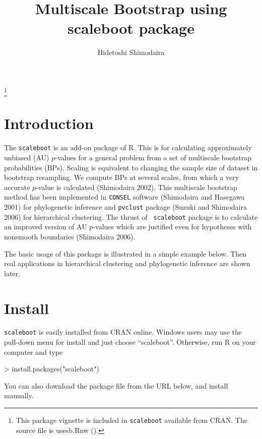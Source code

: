 \documentclass[a4paper]{amsart}
\begin{document}
\title{Multiscale Bootstrap using scaleboot package}
\author{Hidetoshi Shimodaira}
\thanks{This package vignette is included in {\tt scaleboot}
 available from CRAN. The source file is usesb.Rnw (\documentid).}
\address{Department of Mathematical and Computing Sciences\\
Tokyo Institute of Technology\\
2-12-1 Ookayama, Meguro-ku, Tokyo 152-8552, Japan}


\maketitle

\section{Introduction}

The {\tt scaleboot} is an add-on package of R. This is for calculating
approximately unbiased (AU) $p$-values for a general problem from a
set of multiscale bootstrap probabilities (BPs). Scaling is equivalent
to changing the sample size of dataset in bootstrap resampling. We
compute BPs at several scales, from which a very accurate $p$-value is
calculated (Shimodaira 2002). This multiscale bootstrap method has
been implemented in {\tt CONSEL} software (Shimodaira and Hasegawa
2001) for phylogenetic inference and {\tt pvclust} package (Suzuki and
Shimodaira 2006) for hierarchical clustering. The thrust of {\tt
scaleboot} package is to calculate an improved version of AU
$p$-values which are justified even for hypotheses with nonsmooth
boundaries (Shimodaira 2006).

The basic usage of this package is illustrated in a simple example
below.  Then real applications in hierarchical clustering and
phylogenetic inference are shown later.

\section{Install}

{\tt scaleboot} is easily installed from CRAN online. Windows users
may use the pull-down menu for install and just choose
``scaleboot''. Otherwise, run R on your computer and type
\begin{Schunk}
\begin{Sinput}
> install.packages("scaleboot")
\end{Sinput}
\end{Schunk}
You can also download the package file from the URL below, and install
manually.
\end{document}

